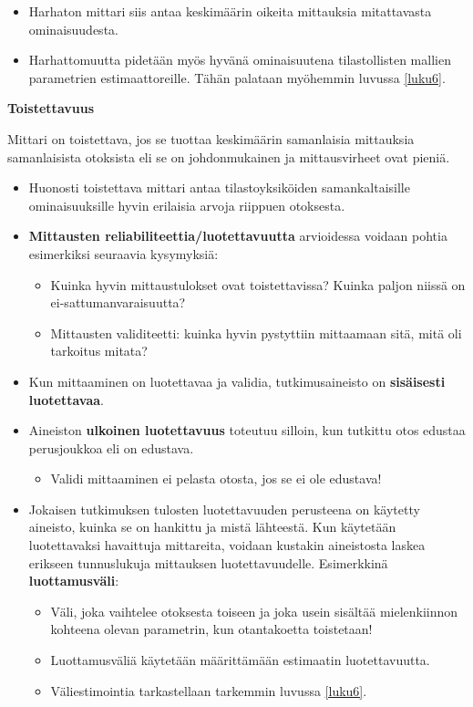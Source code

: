 \documentclass[
]{book}
\providecommand{\tightlist}{%
  \setlength{\itemsep}{0pt}\setlength{\parskip}{0pt}}
\begin{document}
\begin{itemize}
\item
  Harhaton mittari siis antaa keskimäärin oikeita mittauksia mitattavasta ominaisuudesta.
\item
  Harhattomuutta pidetään myös hyvänä ominaisuutena tilastollisten mallien parametrien estimaattoreille. Tähän palataan myöhemmin luvussa \ref{luku6}.
\end{itemize}

\begin{defblock}{}
\textbf{Toistettavuus}

Mittari on toistettava, jos se tuottaa keskimäärin samanlaisia mittauksia samanlaisista otoksista eli se on johdonmukainen ja mittausvirheet ovat pieniä.

\end{defblock}

\begin{itemize}
\item
  Huonosti toistettava mittari antaa tilastoyksiköiden samankaltaisille ominaisuuksille hyvin erilaisia arvoja riippuen otoksesta.
\item
  \textbf{Mittausten reliabiliteettia/luotettavuutta} arvioidessa voidaan pohtia esimerkiksi seuraavia kysymyksiä:

  \begin{itemize}
  \tightlist
  \item
    Kuinka hyvin mittaustulokset ovat toistettavissa? Kuinka paljon niissä on ei-sattumanvaraisuutta?
  \item
    Mittausten validiteetti: kuinka hyvin pystyttiin mittaamaan sitä, mitä oli tarkoitus mitata?
  \end{itemize}
\item
  Kun mittaaminen on luotettavaa ja validia, tutkimusaineisto on \textbf{sisäisesti luotettavaa}.
\item
  Aineiston \textbf{ulkoinen luotettavuus} toteutuu silloin, kun tutkittu otos edustaa perusjoukkoa eli on edustava.

  \begin{itemize}
  \tightlist
  \item
    Validi mittaaminen ei pelasta otosta, jos se ei ole edustava!
  \end{itemize}
\item
  Jokaisen tutkimuksen tulosten luotettavuuden perusteena on käytetty aineisto, kuinka se on hankittu ja mistä lähteestä. Kun käytetään luotettavaksi havaittuja mittareita, voidaan kustakin aineistosta laskea erikseen tunnuslukuja mittauksen luotettavuudelle. Esimerkkinä \textbf{luottamusväli}:

  \begin{itemize}
  \tightlist
  \item
    Väli, joka vaihtelee otoksesta toiseen ja joka usein sisältää mielenkiinnon kohteena olevan parametrin, kun otantakoetta toistetaan!
  \item
    Luottamusväliä käytetään määrittämään estimaatin luotettavuutta.
  \item
    Väliestimointia tarkastellaan tarkemmin luvussa \ref{luku6}.
  \end{itemize}
\end{itemize}
\end{document}
